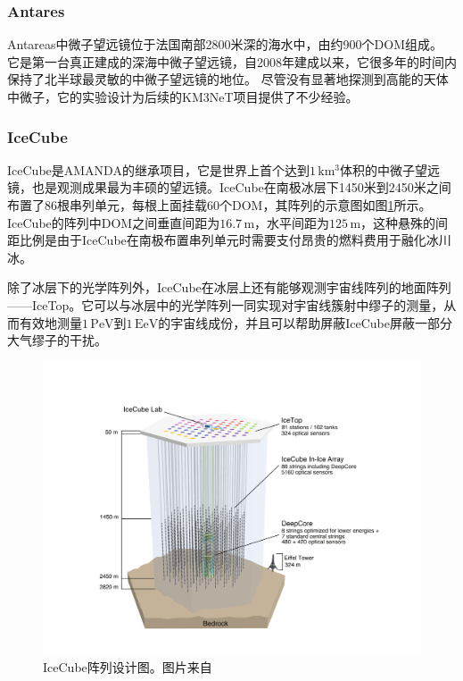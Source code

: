 \subsubsection*{Antares}

Antareas中微子望远镜位于法国南部2800米深的海水中，由约900个DOM组成\cite{ANTARES:2011}。
它是第一台真正建成的深海中微子望远镜，自2008年建成以来，它很多年的时间内保持了北半球最灵敏的中微子望远镜的地位\cite{ANTARES_highlights:2022}。
尽管没有显著地探测到高能的天体中微子，它的实验设计为后续的KM3NeT项目提供了不少经验。

\subsubsection*{IceCube}

IceCube是AMANDA的继承项目，它是世界上首个达到$1\,\mathrm{km^3}$体积的中微子望远镜，也是观测成果最为丰硕的望远镜\cite{IceCube_detector:2016}。IceCube在南极冰层下1450米到2450米之间布置了86根串列单元，每根上面挂载60个DOM，其阵列的示意图如图\ref{fig:IceCube_array}所示。
IceCube的阵列中DOM之间垂直间距为$16.7\,\mathrm{m}$，水平间距为$125\,\mathrm{m}$，这种悬殊的间距比例是由于IceCube在南极布置串列单元时需要支付昂贵的燃料费用于融化冰川冰。

除了冰层下的光学阵列外，IceCube在冰层上还有能够观测宇宙线阵列的地面阵列——IceTop\cite{IceTop:2012}。它可以与冰层中的光学阵列一同实现对宇宙线簇射中缪子的测量，从而有效地测量$1\,\mathrm{PeV}$到$1\,\mathrm{EeV}$的宇宙线成份\cite{IceTop_measurement:2013}，并且可以帮助屏蔽IceCube屏蔽一部分大气缪子的干扰。

\begin{figure}[!htb]
    \centering
    \includegraphics[width=0.8\linewidth]{img/IceCube_array.pdf}
    \caption{IceCube阵列设计图。图片来自\parencite{IceCube_detector:2016}}
    \label{fig:IceCube_array}
\end{figure}


